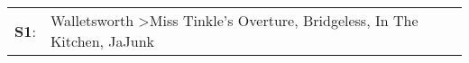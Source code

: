 \begin{supertabular}{p{0.03\textwidth}p{0.92\textwidth}}
 \textbf{S1}:  &  Walletsworth\textsuperscript{} \textgreater \enspace Miss Tinkle's Overture\textsuperscript{}, \enspace Bridgeless\textsuperscript{}, \enspace In The Kitchen\textsuperscript{}, \enspace JaJunk\textsuperscript{}  \enspace  \\
\end{supertabular}
